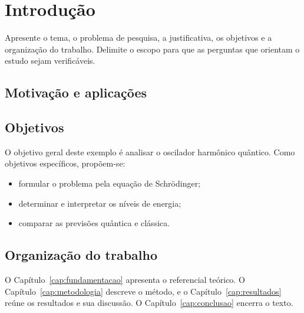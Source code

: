 \chapter{Introdução}
\label{cap:introducao}

Apresente o tema, o problema de pesquisa, a justificativa, os objetivos e a
organização do trabalho. Delimite o escopo para que as perguntas que orientam
o estudo sejam verificáveis.

\section{Motivação e aplicações}



\section{Objetivos}
\label{sec:objetivos}

O objetivo geral deste exemplo é analisar o oscilador harmônico quântico.
Como objetivos específicos, propõem-se:
\begin{itemize}
  \item formular o problema pela equação de Schrödinger;
  \item determinar e interpretar os níveis de energia;
  \item comparar as previsões quântica e clássica.
\end{itemize}

\section{Organização do trabalho}

O Capítulo~\ref{cap:fundamentacao} apresenta o referencial teórico. O
Capítulo~\ref{cap:metodologia} descreve o método, e o
Capítulo~\ref{cap:resultados} reúne os resultados e sua discussão. O
Capítulo~\ref{cap:conclusao} encerra o texto.
